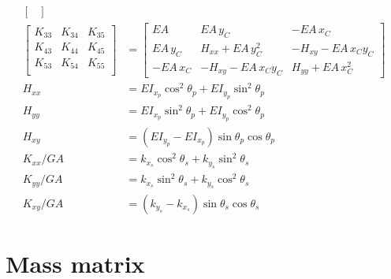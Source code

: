 \documentclass[11pt]{article}
\newcommand{\cent}{{C}}
\newcommand{\EA}{{E\!A}\,}
\newcommand{\EI}{E\!I}
\newcommand{\GA}{G\!A}
\begin{document}
\begin{align}
\begin{bmatrix}
\end{bmatrix}
\nonumber
\\
    \begin{bmatrix}
K_{33} &  K_{34} & K_{35} \\
K_{43} &  K_{44} & K_{45} \\
K_{53} &  K_{54} & K_{55} \\
\end{bmatrix}
&=
    \begin{bmatrix}\EA & \EA y_{\cent} & - \EA x_{\cent}\\\EA y_{\cent} & H_{xx} + \EA y_{\cent}^{2} & - H_{xy} - \EA x_{\cent} y_{\cent}\\- \EA x_{\cent} & - H_{xy} - \EA x_{\cent} y_{\cent} & H_{yy} + \EA x_{\cent}^{2}\end{bmatrix}
\nonumber
    \\
H_{xx} &=  \EI_{x_p} \cos^{2}\theta_p + \EI_{y_p} \sin^{2}\theta_p \nonumber \\
H_{yy} &= \EI_{x_p} \sin^{2}\theta_p + \EI_{y_p} \cos^{2}{\theta_p} \nonumber \\
H_{xy} &= (\EI_{y_p}-\EI_{x_p}) \sin\theta_p \cos\theta_p  \nonumber \\
K_{xx}/\GA &=   k_{x_s} \cos^{2}\theta_s +  k_{y_s} \sin^{2}\theta_s \nonumber\\
K_{yy}/\GA &= k_{x_s} \sin^{2}\theta_s + k_{y_s} \cos^{2}{\theta_s} \nonumber \\
K_{xy}/\GA &= (k_{y_s}-k_{x_s}) \sin\theta_s \cos\theta_s \nonumber
\end{align}





\clearpage
\section{Mass matrix}
\end{document}
